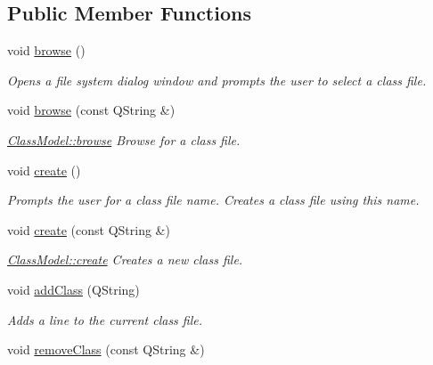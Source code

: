 \subsection*{Public Member Functions}
\begin{DoxyCompactItemize}
\item 
\mbox{\label{classClassModel_a275d7d723cceff7cddea637e29bb5489}} 
void \hyperlink{classClassModel_a275d7d723cceff7cddea637e29bb5489}{browse} ()
\begin{DoxyCompactList}\small\item\em Opens a file system dialog window and prompts the user to select a class file. \end{DoxyCompactList}\item 
void \hyperlink{classClassModel_a1fb7006db6a2aab398a7c82cab2da568}{browse} (const Q\+String \&)
\begin{DoxyCompactList}\small\item\em \hyperlink{classClassModel_a275d7d723cceff7cddea637e29bb5489}{Class\+Model\+::browse} Browse for a class file. \end{DoxyCompactList}\item 
\mbox{\label{classClassModel_afb5c974408ff462e812df971588ea703}} 
void \hyperlink{classClassModel_afb5c974408ff462e812df971588ea703}{create} ()
\begin{DoxyCompactList}\small\item\em Prompts the user for a class file name. Creates a class file using this name. \end{DoxyCompactList}\item 
void \hyperlink{classClassModel_ad2e5262948d7491cf1f8bfd305dff829}{create} (const Q\+String \&)
\begin{DoxyCompactList}\small\item\em \hyperlink{classClassModel_afb5c974408ff462e812df971588ea703}{Class\+Model\+::create} Creates a new class file. \end{DoxyCompactList}\item 
void \hyperlink{classClassModel_ab96bae16ed8f02abf2eca0d7b89a8a62}{add\+Class} (Q\+String)
\begin{DoxyCompactList}\small\item\em Adds a line to the current class file. \end{DoxyCompactList}\item 
void \hyperlink{classClassModel_afe2266d404da4bab25bf193212fed198}{remove\+Class} (const Q\+String \&)

\end{DoxyCompactItemize}
